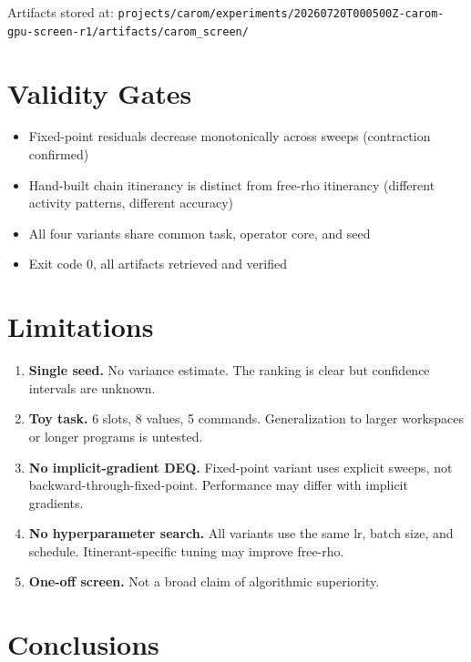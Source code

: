\documentclass[11pt]{article}
\begin{document}
Artifacts stored at: \texttt{projects/carom/experiments/20260720T000500Z-carom-gpu-screen-r1/artifacts/carom\_screen/}

\section{Validity Gates}

\begin{itemize}
    \item[$\checkmark$] Fixed-point residuals decrease monotonically across sweeps (contraction confirmed)
    \item[$\checkmark$] Hand-built chain itinerancy is distinct from free-rho itinerancy (different activity patterns, different accuracy)
    \item[$\checkmark$] All four variants share common task, operator core, and seed
    \item[$\checkmark$] Exit code 0, all artifacts retrieved and verified
\end{itemize}

\section{Limitations}

\begin{enumerate}
    \item \textbf{Single seed.} No variance estimate. The ranking is clear but confidence intervals are unknown.
    \item \textbf{Toy task.} 6 slots, 8 values, 5 commands. Generalization to larger workspaces or longer programs is untested.
    \item \textbf{No implicit-gradient DEQ.} Fixed-point variant uses explicit sweeps, not backward-through-fixed-point. Performance may differ with implicit gradients.
    \item \textbf{No hyperparameter search.} All variants use the same lr, batch size, and schedule. Itinerant-specific tuning may improve free-rho.
    \item \textbf{One-off screen.} Not a broad claim of algorithmic superiority.
\end{enumerate}

\section{Conclusions}
\end{document}
